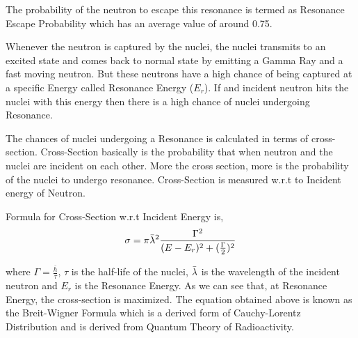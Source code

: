 \documentclass{article}
\begin{document}
\begin{itemize}
\begin{itemize}
    The probability of the neutron to escape this resonance is termed as Resonance Escape Probability which has an average value of around 0.75.\cite{cite12}

    Whenever the neutron is captured by the nuclei, the nuclei transmits to an excited state and comes back to normal state by emitting a Gamma Ray and a fast moving neutron. But these neutrons have a high chance of being captured at a specific Energy called Resonance Energy ($E_r$). If and incident neutron hits the nuclei with this energy then there is a high chance of nuclei undergoing Resonance.

    The chances of nuclei undergoing a Resonance is calculated in terms of cross-section. Cross-Section basically is the probability that when neutron and the nuclei are incident on each other. More the cross section, more is the probability of the nuclei to undergo resonance. Cross-Section is measured w.r.t to Incident energy of Neutron.

    Formula for Cross-Section w.r.t Incident Energy is,
    \[\sigma = \pi \Bar{\lambda}^2 \frac{\Gamma^2}{(E - E_r)^2 + (\frac{\Gamma}{2})^2}\]

    where $\Gamma = \frac{\bar{h}}{\tau}$, $\tau$ is the half-life of the nuclei, $\Bar{\lambda}$ is the wavelength of the incident neutron and $E_r$ is the Resonance Energy. As we can see that, at Resonance Energy, the cross-section is maximized. The equation obtained above is known as the Breit-Wigner Formula which is a derived form of Cauchy-Lorentz Distribution and is derived from Quantum Theory of Radioactivity.
  \end{itemize}
\end{itemize}
\end{document}
